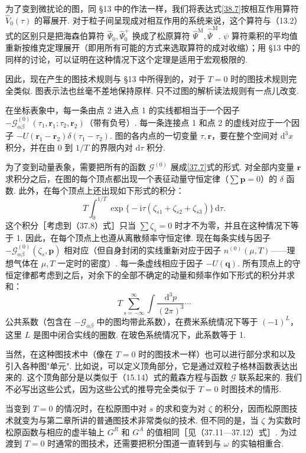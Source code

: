 为了变到微扰论的图，同 §13 中的作法一样，我们将表达式\eqref{38.7}按相互作用算符 $\hat V_0(\tau)$ 的幂展开. 对于粒子间呈现成对相互作用的系统来说，这个算符与（13.2）式的区别只是把海森伯算符 $\hat\Psi_0,\hat\Psi^{+}_0$ 换成了松原算符 $\hat\Psi^{\mathrm M},\hat{\overline\Psi}^{\mathrm M}$. $\psi$ 算符乘积的平均值重新按维克定理展开（即用所有可能的方式来选取算符的成对收缩）；用 §13 中的同样的讨论，可以证明在这种情况下这个定理是适用于宏观极限的.

因此，现在产生的图技术规则与 §13 中所得到的，对于 $T=0$ 时的图技术规则完全类似. 图表示法也丝毫不差地保持原样. 只不过图的解析读法规则有一点儿改变.

在坐标表象中，每一条由点 2 进入点 1 的实线都相当于一个因子 $-\mathcal G^{(0)}_{\alpha\beta}(\tau_1,\bm r_1;\tau_2,\bm r_2)$（带有负号）. 每一条连接点 1 和点 2 的虚线对应于一个因子 $-U(\bm r_1-\bm r_2)\delta(\tau_1-\tau_2)$. 图的各内点的一切变量 $\tau,\bm r$，要在整个空间对 $\mathrm{d}^{3}x$ 积分，并在由 0 到 $1/T$ 的界限内对 $\mathrm{d}\tau$ 积分.

为了变到动量表象，需要把所有的函数 $\mathcal G^{(0)}$ 展成\eqref{37.7}式的形式. 对全部内变量 $\bm r$ 求积分之后，在图的每个顶点都出现一个表征动量守恒定律（$\sum\bm p=0$）的 $\delta$ 函数. 此外，在每个顶点上还出现如下形式的积分：
\begin{equation*}
T\int_{0}^{1/T}\exp\bigl\{-\mathrm{i}\tau(\zeta_{s1}+\zeta_{s2}+\zeta_{s3})\bigr\}\,\mathrm{d}\tau.
\end{equation*}
这个积分［考虑到（37.8）式］只当 $\sum\zeta_s=0$ 时才不为零，并且在这种情况下等于 1. 因此，在每个顶点上也遵从离散频率守恒定律. 现在每条实线与因子 $-\mathcal G^{(0)}_{\alpha\beta}(\zeta_s,\bm p)$ 相对应（但自身封闭的实线重新对应于因子 $n^{(0)}(\mu,T)$——理想气体在 $\mu,T$ 一定时的密度）. 每一条虚线相应于因子 $-U(\bm q)$. 所有顶点上的守恒定律都考虑到之后，对余下的全部不确定的动量和频率作如下形式的积分并求和：
\begin{equation*}
T\sum_{s=-\infty}^{\infty}\int\frac{\mathrm{d}^{3}p}{(2\pi)^{3}}\cdots
\end{equation*}
公共系数（包含在 $-\mathcal G_{\alpha\beta}$ 中的图均带此系数），在费米系统情况下等于 $(-1)^{L}$，这里 $L$ 是图中闭合实线的圈数. 在玻色系统情况下，此系数等于 1.

当然，在这种图技术中（像在 $T=0$ 时的图技术一样）也可以进行部分求和以及引入各种图"单元". 比如说，可以定义顶角部分，它是通过双粒子格林函数表达出来的. 这个顶角部分是以类似于（15.14）式的戴森方程与函数 $\mathcal G$ 联系起来的. 我们不必写出这些公式，因为这些公式的推导完全类似于 $T=0$ 时图技术的情形.

当变到 $T=0$ 的情况时，在松原图中对 $s$ 的求和变为对 $\zeta$ 的积分，因而松原图技术就变为与第二章所讲的普通图技术非常类似的技术. 但不同的是，当 $\zeta$ 为实数时松原函数与相应的虚半轴上 $G^{R}$ 和 $G^{A}$ 的值相同［见（37.11—37.12）式］. 为过渡到 $T=0$ 时通常的图技术，还需要把积分围道一直转到与 $\omega$ 的实轴相重合.
